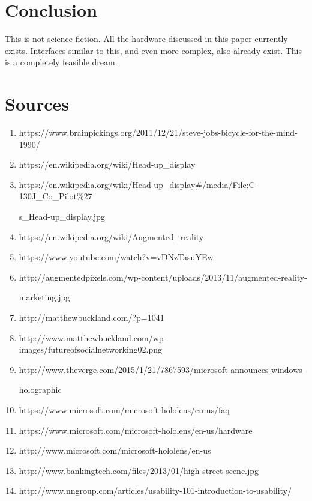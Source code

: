 \documentclass[a4paper,12pt]{article}
\begin{document}
\section{Conclusion}

This is not science fiction. All the hardware discussed in this paper currently exists. Interfaces similar to this, and even more complex, also already exist. This is a completely feasible dream.


\section{Sources}


\begin{enumerate}
    \item https://www.brainpickings.org/2011/12/21/steve-jobs-bicycle-for-the-mind-1990/
    \item https://en.wikipedia.org/wiki/Head-up\_display
    \item https://en.wikipedia.org/wiki/Head-up\_display\#/media/File:C-130J\_Co\_Pilot\%27

    s\_Head-up\_display.jpg
    \item https://en.wikipedia.org/wiki/Augmented\_reality
    \item https://www.youtube.com/watch?v=vDNzTasuYEw
    \item http://augmentedpixels.com/wp-content/uploads/2013/11/augmented-reality-

    marketing.jpg
    \item http://matthewbuckland.com/?p=1041
    \item http://www.matthewbuckland.com/wp-images/futureofsocialnetworking02.png
    \item http://www.theverge.com/2015/1/21/7867593/microsoft-announces-windows-

    holographic
	\item https://www.microsoft.com/microsoft-hololens/en-us/faq
	\item https://www.microsoft.com/microsoft-hololens/en-us/hardware
    \item http://www.microsoft.com/microsoft-hololens/en-us
    \item http://www.bankingtech.com/files/2013/01/high-street-scene.jpg
    \item http://www.nngroup.com/articles/usability-101-introduction-to-usability/
\end{enumerate}
\end{document}

